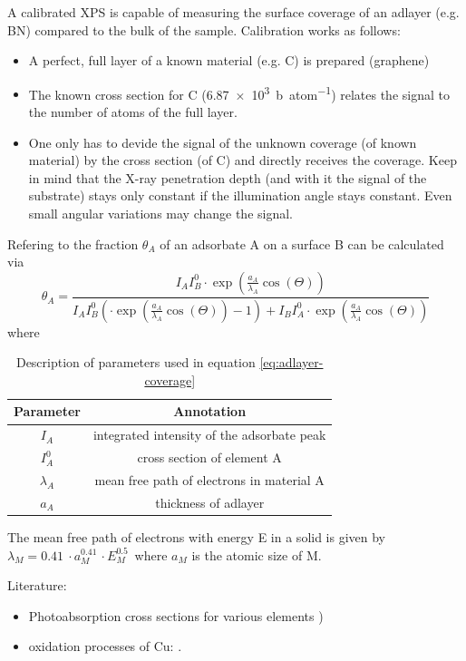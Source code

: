 A calibrated XPS is capable of measuring the surface coverage of an adlayer (e.g. BN) compared to the bulk of the sample. Calibration works as follows:
\begin{itemize}
 \item A perfect, full layer of a known material (e.g. C) is prepared (graphene)
 \item The known cross section for C (\SI{6,87e3}{\barn\per atom})\cite{henke_x-ray_1993} relates the signal to the number of atoms of the full layer.
 \item One only has to devide the signal of the unknown coverage (of known material) by the cross section (of C) and directly receives the coverage. Keep in mind that the X-ray penetration depth (and with it the signal of the substrate) stays only constant if the illumination angle stays constant. Even small angular variations may change the signal.
\end{itemize}
Refering to \cite{ertl_low_1986} the fraction $\theta_A$ of an adsorbate A on a surface B can be calculated via
\begin{equation}\label{eq:adlayer-coverage}
 \theta_A=\frac{I_AI_B^0\cdot \exp(\frac{a_A}{\lambda_A}\cos(\Theta))}{I_AI_B^0(\cdot \exp(\frac{a_A}{\lambda_A}\cos(\Theta))-1)+I_BI_A^0\cdot \exp(\frac{a_A}{\lambda_A}\cos(\Theta))}
\end{equation}
where 
\begin{table}[h!]\centering
\caption{Description of parameters used in equation \ref{eq:adlayer-coverage}}
 \begin{tabular}{cc}
  Parameter & Annotation \\ \hline \hline
  $I_A$	& integrated intensity of the adsorbate peak \\
  $I_A^0$ & cross section of element A \\
  $\lambda_A$ & mean free path of electrons in material A \\
  $a_A$ & thickness of adlayer \\
 \end{tabular}
\end{table}
The mean free path of electrons with energy E in a solid is given by $\lambda_M=\SI{0,41}{}\cdot a_M^{\SI{0,41}{}}\cdot E_M^{\SI{0,5}{}} $ where $a_M$ is the atomic size of M. 

Literature:
\begin{itemize}
 \item Photoabsorption cross sections for various elements \cite{henke_x-ray_1993})
  \item oxidation processes of Cu: \cite{deroubaix_x-ray_1992}.
\end{itemize}